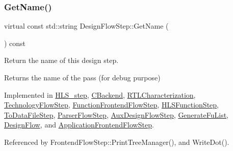 \subsubsection{\texorpdfstring{Get\+Name()}{GetName()}}
{\footnotesize\ttfamily virtual const std\+::string Design\+Flow\+Step\+::\+Get\+Name (\begin{DoxyParamCaption}{ }\end{DoxyParamCaption}) const\hspace{0.3cm}{\ttfamily [pure virtual]}}



Return the name of this design step. 

\begin{DoxyReturn}{Returns}
the name of the pass (for debug purpose) 
\end{DoxyReturn}


Implemented in \hyperlink{classHLS__step_aa60ee88fc2b3b180e118e8dee44f4044}{H\+L\+S\+\_\+step}, \hyperlink{classCBackend_af879cc47d9bc18eb778390825b85667d}{C\+Backend}, \hyperlink{classRTLCharacterization_a0b41ce2d4af25aa22e41dd9af50f1b0b}{R\+T\+L\+Characterization}, \hyperlink{classTechnologyFlowStep_ac50a4cc6222e4872c65c93f55415c3b7}{Technology\+Flow\+Step}, \hyperlink{classFunctionFrontendFlowStep_add9013c4bc46fe7e932151ca5b902d32}{Function\+Frontend\+Flow\+Step}, \hyperlink{classHLSFunctionStep_ab070622813a99accede9dd5f6ba5a3cb}{H\+L\+S\+Function\+Step}, \hyperlink{classToDataFileStep_ada4a3271187ee310379405eaaefc24e1}{To\+Data\+File\+Step}, \hyperlink{classParserFlowStep_adc59d75712212fd7d908550665d5719b}{Parser\+Flow\+Step}, \hyperlink{classAuxDesignFlowStep_aada604a4981c38194ce791b2232e782c}{Aux\+Design\+Flow\+Step}, \hyperlink{classGenerateFuList_a0b6efa299b9de2bc45157d9e28a97a9e}{Generate\+Fu\+List}, \hyperlink{classDesignFlow_aa8b86491bfa371d09a22f863df1c5be8}{Design\+Flow}, and \hyperlink{classApplicationFrontendFlowStep_adc8a9e4cf2fd49e1f0d2270955f474f8}{Application\+Frontend\+Flow\+Step}.



Referenced by Frontend\+Flow\+Step\+::\+Print\+Tree\+Manager(), and Write\+Dot().

